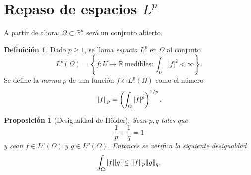\documentclass[12pt,a4paper]{book}
\DeclarePairedDelimiter\norm{\lVert}{\rVert}
\newtheorem{prop}[thm]{Proposición}
\theoremstyle{definition} \newtheorem{defn}[thm]{Definición}
\theoremstyle{definition} \newtheorem{ejemplo}[thm]{Ejemplo}
\theoremstyle{definition} \newtheorem{ejercicio}[thm]{Ejercicio}
\theoremstyle{remark} \newtheorem*{obs}{Observación}
\newcommand{\RR}{\mathbb{R}}
\begin{document}
\section{Repaso de espacios $L^p$}

A partir de ahora, $\Omega\subset \RR^n$ será un conjunto abierto.
\begin{defn}
  Dado $p\geq 1$, se llama \emph{espacio $L^p$} en $\Omega$ al conjunto
  \begin{equation*}
    L^p(\Omega)=\left\{ f:U\rightarrow \RR \text{ medibles} : \int_{\Omega} |f|^2 < \infty \right\}.
  \end{equation*}
  Se define la \emph{norma-$p$} de una función $f\in L^p(\Omega)$ como el número
  \begin{equation*}
    \norm{f}_{p}=\left( \int_{\Omega}|f|^p \right)^{1/p}.   
  \end{equation*}
\end{defn}

\begin{prop}[Desigualdad de Hölder]
  Sean $p,q$ tales que 
  \begin{equation*}
    \frac{1}{p}+\frac{1}{q}=1
  \end{equation*}
  y sean
  $f\in L^p(\Omega)$ y $g\in L^p(\Omega)$. Entonces se verifica la siguiente desigualdad
  \begin{equation*}
    \int_{\Omega}|f| |g| \leq \norm{f}_p \norm{g}_q.
  \end{equation*}
\end{prop}
\end{document}
